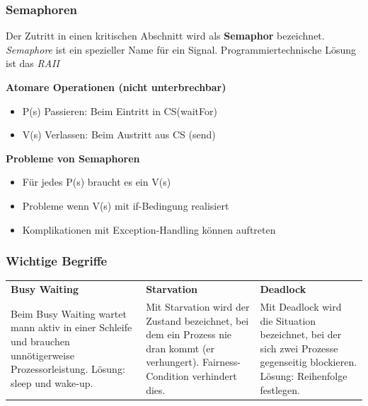 \subsubsection{Semaphoren}
Der Zutritt in einen kritischen Abschnitt wird als \textbf{Semaphor} bezeichnet. \textit{Semaphore} ist ein spezieller Name für ein Signal.
Programmiertechnische Lösung ist das \textit{RAII}\\
\begin{multicols}{2}
  \textbf{Atomare Operationen (nicht unterbrechbar)}
  \begin{itemize}
    \item P(s) Passieren: Beim Eintritt in CS(waitFor)
    \item V(s) Verlassen: Beim Austritt aus CS (send)
  \end{itemize}
  \vfill\null
  \columnbreak
  \textbf{Probleme von Semaphoren}
  \begin{itemize}
    \item Für jedes P(s) braucht es ein V(s)
    \item Probleme wenn V(s) mit if-Bedingung realisiert
    \item Komplikationen mit Exception-Handling können auftreten
  \end{itemize}
\end{multicols}

\subsubsection{Wichtige Begriffe}
  \begin{centering}
  \begin{tabular}{| p{6cm} | p{6cm} | p{6cm} |}
    \hline\textbf{Busy Waiting} & \textbf{Starvation} & \textbf{Deadlock}\\
    Beim Busy Waiting wartet mann aktiv in einer Schleife und brauchen unnötigerweise Prozessorleistung. Lösung: sleep und wake-up.&
    Mit Starvation wird der Zustand bezeichnet, bei dem ein Prozess nie dran kommt (er verhungert). Fairness-Condition verhindert dies.&
    Mit Deadlock wird die Situation bezeichnet, bei der sich zwei Prozesse gegenseitig blockieren. Lösung: Reihenfolge festlegen.\\\hline
  \end{tabular}
  \end{centering}

